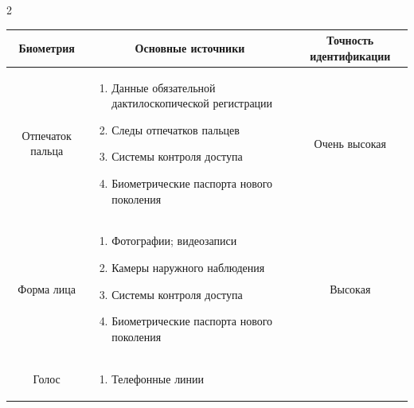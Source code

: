 \begin{multicols}{2}
\begin{table}
\begin{center}
\begin{tabular}{|c|p{70mm}|c|}
  \hline

\multicolumn{1}{|c|}{Биометрия}&\multicolumn{1}{c|}{Основные источники}&\multicolumn{1}{|c|}{Точность идентификации}\\

\hline

Отпечаток пальца &

\vspace*{-12pt}

\begin{enumerate}[1.]

\item Данные обязательной дактилоскопической регистрации

\item Следы отпечатков пальцев

\item Системы контроля доступа

\item Биометрические паспорта нового поколения

\end{enumerate}

\vspace*{-14pt} &  Очень высокая\\

\hline

Форма лица &

\vspace*{-12pt}

\begin{enumerate}[1.]

\item Фотографии; видеозаписи

\item Камеры наружного наблюдения

\item Системы контроля доступа

\item Биометрические паспорта нового поколения \end{enumerate}

\vspace*{-14pt}  & Высокая\\

\hline

Голос  & 

\vspace*{-12pt}

\begin{enumerate}[1.]

\item Телефонные линии


\end{enumerate}
\end{tabular}
\end{center}
\end{table}
\end{multicols}
